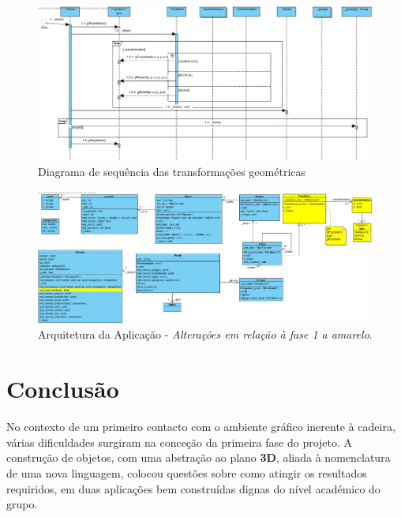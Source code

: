 \documentclass[runningheads]{llncs}
\begin{document}
\begin{landscape}
    \begin{figure}
        \centering
        \includegraphics[width=\linewidth]{assets/geom_transf.jpg}
        \caption{Diagrama de sequência das transformações geométricas} \label{fig:seq_transf_geom}
    \end{figure}
\end{landscape}

\begin{landscape}
    \begin{figure}
        \centering
        \includegraphics[width=\linewidth]{assets/world.jpg}
        \caption{Arquitetura da Aplicação - \textit{Alterações em relação à fase 1 a amarelo}.}
    \end{figure}
\end{landscape}



\section{Conclusão}
No contexto de um primeiro contacto com o ambiente gráfico inerente à cadeira, várias dificuldades surgiram na conceção da primeira fase do projeto.
A construção de objetos, com uma abstração ao plano \textbf{3D}, aliada à nomenclatura de uma nova linguagem, colocou questões sobre como atingir os resultados requiridos, em duas aplicações bem construídas dignas do nível académico do grupo.
\end{document}
